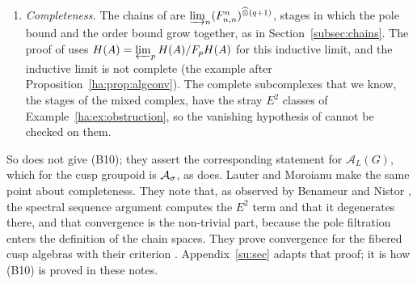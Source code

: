 \begin{remark}
\begin{enumerate}
hand, \cite{BN} do not give a proof but refer to an earlier paper for
the \(E^2\) term and for \(\HH(\mathcal A_L(F))\) \cite[Lemma~5,
Lemma~7]{BN}.
\item \emph{Completeness.} The chains of \cite[(8)]{BN} are
\(\varinjlim_n(F^n_{n,n})^{\widehat\otimes(q+1)}\), stages in which the
pole bound and the order bound grow together, as in
Section~\ref{subsec:chains}. The proof of \cite[Thm.~1]{BN} uses
\(H(A)=\varprojlim_pH(A)/F_pH(A)\) for this inductive limit, and the
inductive limit is not complete (the example after
Proposition~\ref{ha:prop:algconv}). The complete subcomplexes that we
know, the stages of the mixed complex, have the stray \(E^2\) classes of
Example~\ref{ha:ex:obstruction}, so the vanishing hypothesis of
\cite[Thm.~1]{BN} cannot be checked on them.
\end{enumerate}
So \cite{BN} does not give (B10); they assert the corresponding statement
for \(\mathcal A_L(G)\), which for the cusp groupoid is \(\mathcal A_\sigma\), as
\cite[p.~12]{MN} does. Lauter and Moroianu make the same point about
completeness. They note \cite[\S5]{LauterMoroianu} that, as observed by
Benameur and Nistor \cite{BNcomplete}, the spectral sequence argument
computes the \(E^2\) term and that it degenerates there, and that
convergence is the non-trivial part, because the pole filtration enters
the definition of the chain spaces. They prove convergence for the
fibered cusp algebras with their criterion \cite[Thm.~B.4]{LauterMoroianu}.
Appendix~\ref{su:sec} adapts that proof; it is how (B10) is proved in
these notes.
\end{remark}
